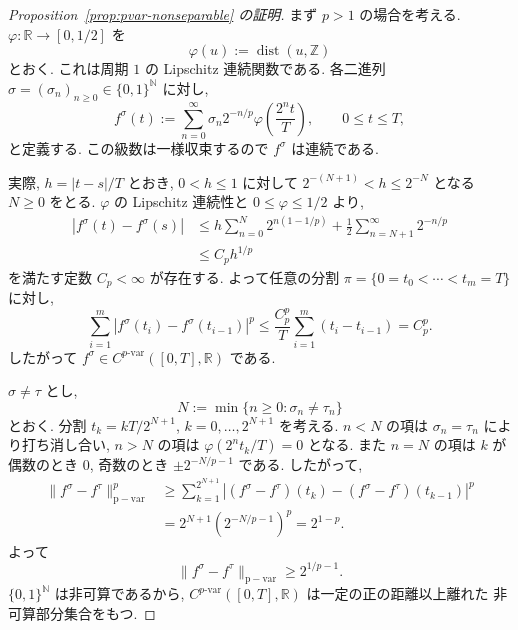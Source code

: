 \documentclass[11pt]{article}
\theoremstyle{breakstyle}
\begin{document}
\begin{proof}[Proposition~\ref{prop:pvar-nonseparable} の証明]
    まず $p>1$ の場合を考える. $\varphi:\mathbb{R}\to[0,1/2]$ を
    \begin{equation*}
        \varphi(u):=\operatorname{dist}(u,\mathbb{Z})
    \end{equation*}
    とおく. これは周期 $1$ の Lipschitz 連続関数である.
    各二進列 $\sigma=(\sigma_n)_{n\geq0}\in\{0,1\}^{\mathbb{N}}$ に対し,
    \begin{equation*}
        f^\sigma(t)
        :=\sum_{n=0}^\infty
        \sigma_n2^{-n/p}\varphi\!\left(\frac{2^nt}{T}\right),
        \qquad 0\leq t\leq T,
    \end{equation*}
    と定義する. この級数は一様収束するので $f^\sigma$ は連続である.

    実際, $h=|t-s|/T$ とおき, $0<h\leq1$ に対して
    $2^{-(N+1)}<h\leq2^{-N}$ となる $N\geq0$ をとる. $\varphi$ の
    Lipschitz 連続性と $0\leq\varphi\leq1/2$ より,
    \begin{align*}
        |f^\sigma(t)-f^\sigma(s)|
        &\leq
        h\sum_{n=0}^N2^{n(1-1/p)}
        +\frac12\sum_{n=N+1}^\infty2^{-n/p}\\
        &\leq C_p h^{1/p}
    \end{align*}
    を満たす定数 $C_p<\infty$ が存在する. よって任意の分割
    $\pi=\{0=t_0<\cdots<t_m=T\}$ に対し,
    \begin{equation*}
        \sum_{i=1}^m|f^\sigma(t_i)-f^\sigma(t_{i-1})|^p
        \leq \frac{C_p^p}{T}\sum_{i=1}^m(t_i-t_{i-1})
        =C_p^p.
    \end{equation*}
    したがって $f^\sigma\in C^{p\text{-var}}([0,T],\mathbb{R})$ である.

    $\sigma\neq\tau$ とし,
    \begin{equation*}
        N:=\min\{n\geq0:\sigma_n\neq\tau_n\}
    \end{equation*}
    とおく. 分割 $t_k=kT/2^{N+1}$, $k=0,\ldots,2^{N+1}$ を考える.
    $n<N$ の項は $\sigma_n=\tau_n$ により打ち消し合い, $n>N$ の項は
    $\varphi(2^nt_k/T)=0$ となる. また $n=N$ の項は $k$ が偶数のとき $0$,
    奇数のとき $\pm2^{-N/p-1}$ である. したがって,
    \begin{align*}
        \|f^\sigma-f^\tau\|_{\mathrm{p-var}}^p
        &\geq
        \sum_{k=1}^{2^{N+1}}
        |(f^\sigma-f^\tau)(t_k)-(f^\sigma-f^\tau)(t_{k-1})|^p\\
        &=2^{N+1}\left(2^{-N/p-1}\right)^p
        =2^{1-p}.
    \end{align*}
    よって
    \begin{equation*}
        \|f^\sigma-f^\tau\|_{\mathrm{p-var}}
        \geq 2^{1/p-1}.
    \end{equation*}
    $\{0,1\}^{\mathbb{N}}$ は非可算であるから,
    $C^{p\text{-var}}([0,T],\mathbb{R})$ は一定の正の距離以上離れた
    非可算部分集合をもつ.


\end{proof}
\end{document}
